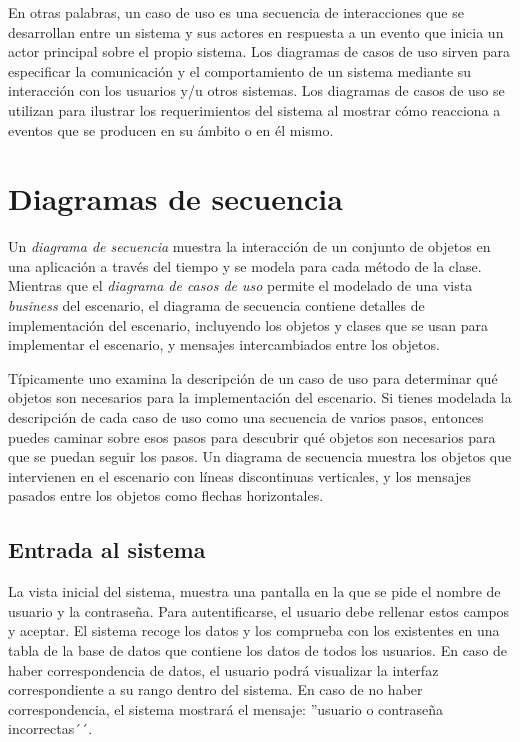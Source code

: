 \documentclass[11pt,a4paper,spanish,twoside]{book}
\begin{document}
En otras palabras, un caso de uso es una secuencia de interacciones que se
desarrollan entre un sistema y sus actores en respuesta a un evento que
inicia un actor principal sobre el propio sistema. Los diagramas de casos de
uso sirven para especificar la comunicación y el comportamiento de un sistema
mediante su interacción con los usuarios y/u otros sistemas. Los diagramas de
casos de uso se utilizan para ilustrar los requerimientos del sistema al
mostrar cómo reacciona a eventos que se producen en su ámbito o en él mismo.

\section{Diagramas de secuencia}
Un \emph{diagrama de secuencia} muestra la interacción de un conjunto de
objetos en una aplicación a través del tiempo y se modela para cada método de
la clase. Mientras que el \emph{diagrama de casos de uso} permite el modelado
de una vista \emph{business} del escenario, el diagrama de secuencia contiene
detalles de implementación del escenario, incluyendo los objetos y clases que
se usan para implementar el escenario, y mensajes intercambiados entre los
objetos.

Típicamente uno examina la descripción de un caso de uso para determinar qué
objetos son necesarios para la implementación del escenario. Si tienes
modelada la descripción de cada caso de uso como una secuencia de varios
pasos, entonces puedes caminar sobre esos pasos para descubrir qué objetos
son necesarios para que se puedan seguir los pasos. Un diagrama de secuencia
muestra los objetos que intervienen en el escenario con líneas discontinuas
verticales, y los mensajes pasados entre los objetos como flechas horizontales.

\subsection{Entrada al sistema}
La vista inicial del sistema, muestra una pantalla en la que se pide el nombre
de usuario y la contraseña. Para autentificarse, el usuario debe rellenar
estos campos y aceptar. El sistema recoge los datos y los comprueba con los
existentes en una tabla de la base de datos que contiene los datos de todos
los usuarios. En caso de haber correspondencia de datos, el usuario podrá
visualizar la interfaz correspondiente a su rango dentro del sistema. En
caso de no haber correspondencia, el sistema mostrará el mensaje: ''usuario
o contraseña incorrectas´´.
\end{document}
